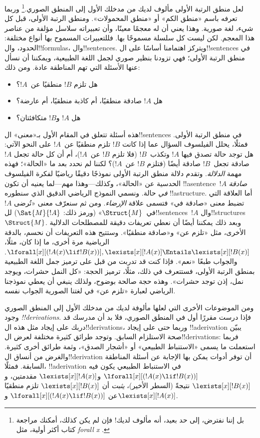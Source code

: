 \documentclass[../../../include/open-logic-section]{subfiles}
\begin{document}


لعل منطق الرتبة الأولى مألوف لديك من مدخلك الأول إلى المنطق
الصوري.\footnote{بل إننا نفترض، إلى حد بعيد، أنه مألوف لديك!{} فإن لم
  يكن كذلك، أمكنك مراجعة كتاب أكثر أولية، مثل \emph{forall x}
  \citep{Magnus2021}.} وربما تعرفه باسم «منطق الكم» أو «منطق
المحمولات». ومنطق الرتبة الأولى، قبل كل شيء، لغة صورية. وهذا يعني أن له
معجمًا معينًا، وأن تعبيراته سلاسل مؤلفة من عناصر هذا المعجم. لكن ليست
كل سلسلة مسموحًا بها. فللتعبيرات المسموح بها أنواع مختلفة: الحدود،
وال!!{formula}s، وال!!{sentence}s. ويتركز اهتمامنا أساسًا على
ال!!{sentence}s في منطق الرتبة الأولى؛ فهي تزودنا بنظير صوري لجمل اللغة
الطبيعية، ويمكننا أن نسأل عنها الأسئلة التي تهم المناطقة عادة. ومن ذلك:
\begin{itemize}
    \item هل تلزم $!B$ منطقيًا عن~$!A$؟
    \item هل $!A$ صادقة منطقيًا، أم كاذبة منطقيًا، أم عارضة؟
    \item هل $!A$ و$!B$ متكافئتان؟
\end{itemize}

هذه أسئلة تتعلق في المقام الأول بـ«معنى» ال!!{sentence}s في منطق الرتبة
الأولى. فمثلًا، يحلل الفيلسوف السؤال عما إذا كانت $!B$ تلزم منطقيًا
عن~$!A$ على النحو الآتي: هل توجد حالة تصدق فيها $!A$ وتكذب~$!B$ (فلا
تلزم $!B$ عن~$!A$)، أم أن كل حالة تجعل $!A$ صادقة تجعل~$!B$ صادقة
أيضًا (فتلزم $!B$ عن~$!A$)؟ لكننا لم نحدد بعد ما «الحالة»؛ فهذه مهمة
\emph{الدلالة}. وتقدم دلالة منطق الرتبة الأولى نموذجًا دقيقًا رياضيًا
لفكرة الفيلسوف الحدسية عن «الحالة»، وكذلك---وهذا مهم---لما يعنيه أن
تكون !!a{sentence}~$!A$ \emph{صادقة في} حالة. ونسمي النموذج الرياضي
الدقيق الذي سنطوره !!a{structure}. أما العلاقة التي تضبط معنى «صادقة
في» فتسمى علاقة \emph{الإرضاء}. ومن ثم سنعرّف معنى «تُرضى $!A$
في~$\Struct{M}$» (ورمز ذلك: $\Sat{M}{!A}$) لل!!{sentence}s~$!A$
وال!!{structure}s~$\Struct{M}$. وبعد ذلك يمكننا أيضًا أن نعطي تعريفات
دقيقة للمصطلحات الدلالية الأخرى، مثل «تلزم عن» و«صادقة منطقيًا». وستتيح
هذه التعريفات أن نحسم، بالدقة الرياضية مرة أخرى، ما إذا كان، مثلًا،
$\lforall[x][(!A(x) \lif !B(x))],
\lexists[x][!A(x)] \Entails \lexists[x][!B(x)]$. والجواب طبعًا «نعم».
فإذا كنت قد تدربت من قبل على ترميز جمل اللغة الطبيعية بمنطق الرتبة
الأولى، فستتعرف في ذلك، مثلًا، ترميز الحجة: «كل النمل حشرات، ويوجد نمل،
إذن توجد حشرات». وهذه حجة صالحة بوضوح، ولذلك ينبغي أن يعطي نموذجنا
الرياضي لعبارة «تلزم عن» في لغتنا الصورية الجواب نفسه.

ومن الموضوعات الأخرى التي لعلها مألوفة لديك من مدخلك الأول إلى المنطق
الصوري وجود \emph{!!{derivation}s}. فإذا درست مقررًا أول في المنطق
الصوري، فلا بد أن مدرسك قد دربك على إيجاد مثل هذه ال!!{derivation}s،
وربما حتى على إيجاد !!a{derivation} يبيّن صحة الاستلزام السابق. وتوجد
طرائق كثيرة مختلفة لعرض ال!!{derivation}s: فربما استعملت ما يسمى
«الاستنباط الطبيعي» أو «أشجار الصدق»، وثمة طرائق أخرى كثيرة. والغرض من
أنساق ال!!{derivation} أن توفر أدوات يمكن بها الإجابة عن أسئلة المناطقة
السابقة. فمثلًا، !!a{derivation} في الاستنباط الطبيعي يكون فيه
$\lforall[x][(!A(x) \lif !B(x))]$ و$\lexists[x][!A(x)]$ مقدمتين،
و$\lexists[x][!B(x)]$ نتيجةً (السطر الأخير)، \emph{يثبت} أن
$\lexists[x][!B(x)]$ تلزم منطقيًا عن
$\lforall[x][(!A(x) \lif !B(x))]$ و$\lexists[x][!A(x)]$.
\end{document}
